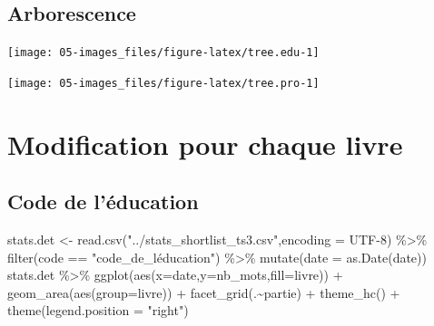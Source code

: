 \documentclass[
  oneside]{book}
\newenvironment{Shaded}{\begin{snugshade}}{\end{snugshade}}
\newcommand{\AttributeTok}[1]{\textcolor[rgb]{0.77,0.63,0.00}{#1}}
\newcommand{\FunctionTok}[1]{\textcolor[rgb]{0.00,0.00,0.00}{#1}}
\newcommand{\NormalTok}[1]{#1}
\newcommand{\OtherTok}[1]{\textcolor[rgb]{0.56,0.35,0.01}{#1}}
\newcommand{\SpecialCharTok}[1]{\textcolor[rgb]{0.00,0.00,0.00}{#1}}
\newcommand{\StringTok}[1]{\textcolor[rgb]{0.31,0.60,0.02}{#1}}
\begin{document}
\hypertarget{arborescence}{%
\subsection{Arborescence}\label{arborescence}}

\begin{center}\texttt{[image: 05-images\_files/figure-latex/tree.edu-1]} \end{center}

\begin{center}\texttt{[image: 05-images\_files/figure-latex/tree.pro-1]} \end{center}

\hypertarget{modification-pour-chaque-livre}{%
\section{Modification pour chaque livre}\label{modification-pour-chaque-livre}}

\hypertarget{code-de-luxe9ducation}{%
\subsection{Code de l'éducation}\label{code-de-luxe9ducation}}

\begin{Shaded}
\begin{Highlighting}[]
\NormalTok{stats.det }\OtherTok{\textless{}{-}} \FunctionTok{read.csv}\NormalTok{(}\StringTok{"../stats\_shortlist\_ts3.csv"}\NormalTok{,}\AttributeTok{encoding =} \StringTok{\textquotesingle{}UTF{-}8\textquotesingle{}}\NormalTok{) }\SpecialCharTok{\%\textgreater{}\%}
  \FunctionTok{filter}\NormalTok{(code }\SpecialCharTok{==} \StringTok{"code\_de\_l\textquotesingle{}éducation"}\NormalTok{) }\SpecialCharTok{\%\textgreater{}\%}
  \FunctionTok{mutate}\NormalTok{(}\AttributeTok{date =} \FunctionTok{as.Date}\NormalTok{(date)) }
\NormalTok{stats.det }\SpecialCharTok{\%\textgreater{}\%}
  \FunctionTok{ggplot}\NormalTok{(}\FunctionTok{aes}\NormalTok{(}\AttributeTok{x=}\NormalTok{date,}\AttributeTok{y=}\NormalTok{nb\_mots,}\AttributeTok{fill=}\NormalTok{livre)) }\SpecialCharTok{+}
  \FunctionTok{geom\_area}\NormalTok{(}\FunctionTok{aes}\NormalTok{(}\AttributeTok{group=}\NormalTok{livre)) }\SpecialCharTok{+}
  \FunctionTok{facet\_grid}\NormalTok{(.}\SpecialCharTok{\textasciitilde{}}\NormalTok{partie)  }\SpecialCharTok{+}
  \FunctionTok{theme\_hc}\NormalTok{() }\SpecialCharTok{+} 
  \FunctionTok{theme}\NormalTok{(}\AttributeTok{legend.position =} \StringTok{"right"}\NormalTok{)}
\end{Highlighting}
\end{Shaded}
\end{document}
